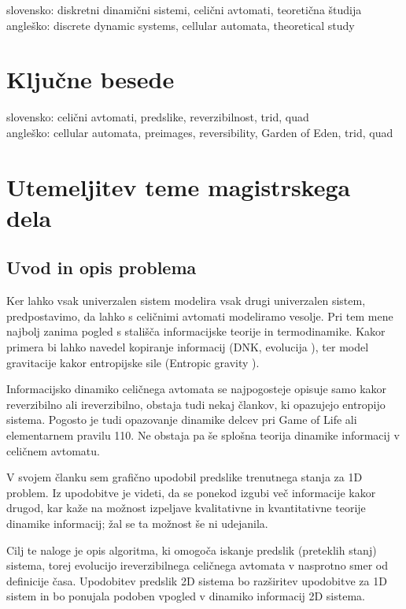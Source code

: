 \documentclass[a4paper, 12pt]{article}
\begin{document}
slovensko: diskretni dinamični sistemi, celični avtomati, teoretična študija \\
angleško: discrete dynamic systems, cellular automata, theoretical study


\section{Ključne besede}

slovensko: celični avtomati, predslike, reverzibilnost, trid, quad   \\
angleško: cellular automata, preimages, reversibility, Garden of Eden,  trid, quad


\section{Utemeljitev teme magistrskega dela}

\subsection{Uvod in opis problema}

Ker lahko vsak univerzalen sistem modelira vsak drugi univerzalen sistem, predpostavimo,
da lahko s celičnimi avtomati modeliramo vesolje. Pri tem mene najbolj zanima pogled s
stališča informacijske teorije in termodinamike. Kakor primera bi lahko navedel kopiranje informacij
(DNK, evolucija \cite{Salzberg2004}), ter model gravitacije kakor entropijske sile (Entropic gravity \cite{Verlinde2010}).

Informacijsko dinamiko celičnega avtomata se najpogosteje opisuje samo kakor reverzibilno ali ireverzibilno,
obstaja tudi nekaj člankov, ki opazujejo entropijo sistema.
Pogosto je tudi opazovanje dinamike delcev pri Game of Life ali elementarnem pravilu 110.
Ne obstaja pa še splošna teorija dinamike informacij v celičnem avtomatu.

V svojem članku \cite{JerasDobnikar2007} sem grafično upodobil predslike trenutnega stanja za 1D problem.
Iz upodobitve je videti, da se ponekod izgubi več informacije kakor drugod,
kar kaže na možnost izpeljave kvalitativne in kvantitativne teorije dinamike informacij;
žal se ta možnost še ni udejanila.

Cilj te naloge je opis algoritma, ki omogoča iskanje predslik (preteklih stanj) sistema, torej evolucijo
ireverzibilnega celičnega avtomata v nasprotno smer od definicije časa.
Upodobitev predslik 2D sistema bo razširitev upodobitve za 1D sistem
in bo ponujala podoben vpogled v dinamiko informacij 2D sistema.
\end{document}
